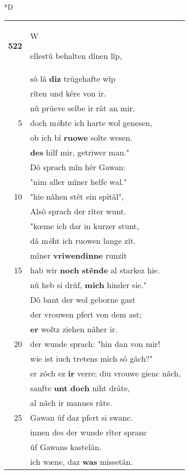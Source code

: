 \documentclass[8pt,a4paper,notitlepage]{article}
\begin{document}
\begin{table}[ht]
\begin{minipage}[t]{0.5\linewidth}
\small
\begin{center}*D
\end{center}
\begin{tabular}{rl}
\textbf{522} & \begin{large}W\end{large}ellestû behalten dînen lîp,\\ 
 & sô lâ \textbf{diz} trügehafte wîp\\ 
 & rîten und kêre von ir.\\ 
 & nû prüeve selbe ir rât an mir.\\ 
5 & doch m\textit{ö}hte ich harte wol genesen,\\ 
 & ob ich bî \textbf{ruowe} solte wesen.\\ 
 & \textbf{des} hilf mir, getriwer man."\\ 
 & Dô sprach mîn hêr Gawan:\\ 
 & "nim aller mîner helfe wal."\\ 
10 & "hie nâhen stêt ein spitâl",\\ 
 & Alsô sprach der rîter wunt.\\ 
 & "kœme ich dar in kurzer stunt,\\ 
 & dâ m\textit{ö}ht ich ruowen lange zît.\\ 
 & mîner \textbf{vriwendinne} runzît\\ 
15 & hab wir \textbf{noch} \textbf{stênde} al starkez hie.\\ 
 & nû heb si drûf, \textbf{mich} hinder sie."\\ 
 & Dô bant der wol geborne gast\\ 
 & der vrouwen pfert von dem ast;\\ 
 & \textbf{er} woltz ziehen nâher ir.\\ 
20 & der wunde sprach: "hin dan von mir!\\ 
 & wie ist iuch tretens mich sô gâch?"\\ 
 & er zôch ez \textbf{ir} verre; diu vrouwe gienc nâch,\\ 
 & sanfte \textbf{unt} \textbf{doch} niht drâte,\\ 
 & al nâch ir mannes râte.\\ 
25 & Gawan ûf daz pfert si swanc.\\ 
 & innen des der wunde rîter spranc\\ 
 & ûf Gawans kastelân.\\ 
 & ich wæne, daz \textbf{was} missetân.\\ 

\end{tabular}
\end{minipage}
\end{table}
\end{document}
